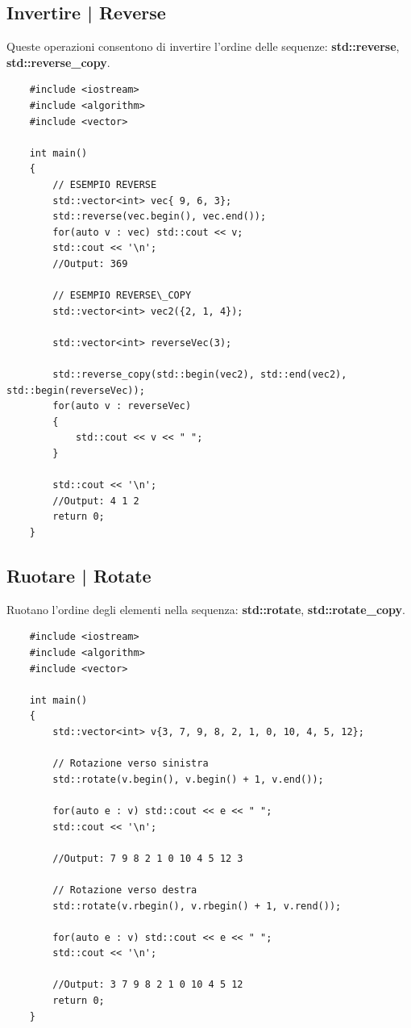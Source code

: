 \subsection{Invertire | Reverse}

\textsf{\small Queste operazioni consentono di invertire l'ordine delle sequenze: \textbf{std::reverse}, \textbf{std::reverse\_copy}.} \\

\begin{lstlisting}
	#include <iostream>
	#include <algorithm>
	#include <vector>
	
	int main()
	{
		// ESEMPIO REVERSE
		std::vector<int> vec{ 9, 6, 3};
		std::reverse(vec.begin(), vec.end());
		for(auto v : vec) std::cout << v;
		std::cout << '\n';
		//Output: 369
		
		// ESEMPIO REVERSE\_COPY
		std::vector<int> vec2({2, 1, 4});
		
		std::vector<int> reverseVec(3);
		
		std::reverse_copy(std::begin(vec2), std::end(vec2), std::begin(reverseVec));
		for(auto v : reverseVec)
		{
			std::cout << v << " ";
		}
	
		std::cout << '\n';
		//Output: 4 1 2
		return 0;
	}
\end{lstlisting}

\subsection{Ruotare | Rotate}

\textsf{\small Ruotano l'ordine degli elementi nella sequenza: \textbf{std::rotate}, \textbf{std::rotate\_copy}.} \\

\begin{lstlisting}
	#include <iostream>
	#include <algorithm>
	#include <vector>
	
	int main()
	{
		std::vector<int> v{3, 7, 9, 8, 2, 1, 0, 10, 4, 5, 12};
		
		// Rotazione verso sinistra
		std::rotate(v.begin(), v.begin() + 1, v.end());
		
		for(auto e : v) std::cout << e << " ";
		std::cout << '\n';
		
		//Output: 7 9 8 2 1 0 10 4 5 12 3
		
		// Rotazione verso destra
		std::rotate(v.rbegin(), v.rbegin() + 1, v.rend());
		
		for(auto e : v) std::cout << e << " ";
		std::cout << '\n';
		
		//Output: 3 7 9 8 2 1 0 10 4 5 12
		return 0;
	}
\end{lstlisting}


